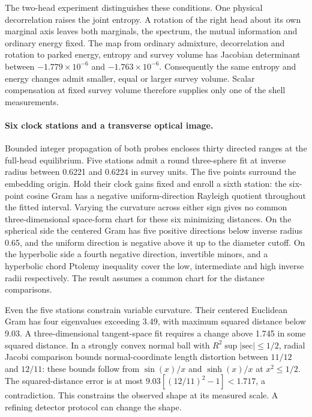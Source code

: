 \documentclass[11pt]{article}
\begin{document}
The two-head experiment distinguishes these conditions. One
physical decorrelation raises the joint entropy. A rotation of the
right head about its own marginal axis leaves both marginals, the
spectrum, the mutual information and ordinary energy fixed.
The map from ordinary admixture, decorrelation and rotation to
parked energy, entropy and survey volume has Jacobian determinant
between \(-1.779\times10^{-6}\) and \(-1.763\times10^{-6}\).
Consequently the same entropy and energy changes admit smaller,
equal or larger survey volume. Scalar compensation at fixed survey
volume therefore supplies only one of the shell measurements.

\paragraph{Six clock stations and a transverse optical image.}
Bounded integer propagation of both probes encloses thirty directed
ranges at the full-head equilibrium. Five stations admit a round
three-sphere fit at inverse radius between 0.6221 and 0.6224 in
survey units. The five points surround the embedding origin. Hold
their clock gains fixed and enroll a sixth station: the six-point
cosine Gram has a negative uniform-direction Rayleigh quotient
throughout the fitted interval. Varying the curvature across either
sign gives no common three-dimensional space-form chart for these
six minimizing distances. On the spherical side the centered Gram
has five positive directions below inverse radius 0.65, and the
uniform direction is negative above it up to the diameter cutoff.
On the hyperbolic side a fourth negative direction, invertible
minors, and a hyperbolic chord Ptolemy inequality cover the low,
intermediate and high inverse radii respectively. The result
assumes a common chart for the distance comparisons.

Even the five stations constrain variable curvature.
Their centered Euclidean Gram has four eigenvalues exceeding 3.49,
with maximum squared distance below 9.03. A three-dimensional
tangent-space fit requires a change above 1.745 in some squared
distance. In a strongly convex normal ball with
\(R^2\sup|\mathrm{sec}|\le1/2\), radial Jacobi comparison bounds
normal-coordinate length distortion between \(11/12\) and \(12/11\):
these bounds follow from \(\sin(x)/x\) and \(\sinh(x)/x\) at
\(x^2\le1/2\). The squared-distance error is at most
\(9.03[(12/11)^2-1]<1.717\), a contradiction. This constrains the
observed shape at its measured scale. A refining detector protocol
can change the shape.
\end{document}
